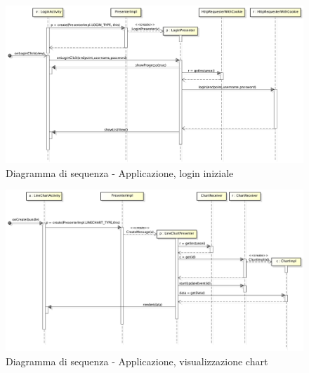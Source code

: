 
        


            \begin{figure}[H]
                \centering
                \includegraphics[scale=0.3]{DefinizioneDiProdotto/Pics/ApplicazioneLogin}
                \caption{Diagramma di sequenza - Applicazione, login iniziale}
            \end{figure}


            \begin{figure}[H]
                \centering
                \includegraphics[scale=0.3]{DefinizioneDiProdotto/Pics/ApplicazioneVisualizzazioneChart}
                \caption{Diagramma di sequenza - Applicazione, visualizzazione chart}
            \end{figure}


